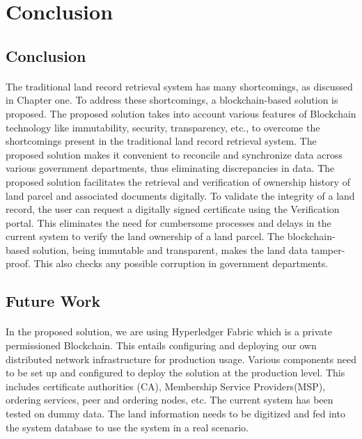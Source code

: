 \documentclass{article}
\begin{document}
    \section{Conclusion}
        \subsection{Conclusion}
            \paragraph{}
            The traditional land record retrieval system has many shortcomings, as discussed in Chapter one. To address these shortcomings, a blockchain-based solution is proposed. The proposed solution takes into account various features of Blockchain technology like immutability, security, transparency, etc., to overcome the shortcomings present in the traditional land record retrieval system. The proposed solution makes it convenient to reconcile and synchronize data across various government departments, thus eliminating discrepancies in data. The proposed solution facilitates the retrieval and verification of ownership history of land parcel and associated documents digitally. To validate the integrity of a land record, the user can request a digitally signed certificate using the Verification portal. This eliminates the need for cumbersome processes and delays in the current system to verify the land ownership of a land parcel. The blockchain-based solution, being immutable and transparent, makes the land data tamper-proof. This also checks any possible corruption in government departments.
        
        \subsection{Future Work}
            \paragraph{}
            In the proposed solution, we are using Hyperledger Fabric \cite{fabric} which is a private permissioned Blockchain. This entails configuring and deploying our own distributed network infrastructure for production usage. Various components need to be set up and configured to deploy the solution at the production level. This includes certificate authorities (CA), Membership Service Providers(MSP), ordering services, peer and ordering nodes, etc. The current system has been tested on dummy data. The land information needs to be digitized and fed into the system database to use the system in a real scenario. 
            
\end{document}

